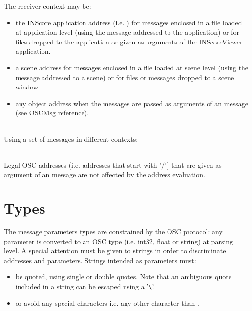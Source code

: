 \documentclass[a4paper,twoside]{report}
\newcommand{\sublevel}[1]	{\section{#1}}
\begin{document}
The receiver context may be:
\begin{itemize}
\item the INScore application address (i.e. ) for messages enclosed in a file loaded at application level (using the  message addressed to the application) or for files dropped to the application or given as arguments of the INScoreViewer application.
\item a scene address for messages enclosed in a file loaded at scene level (using the  message addressed to a scene) or for files or messages dropped to a scene window.
\item any object address when the messages are passed as arguments of an  message (see \href{https://inscoredoc.grame.fr/refs/4-miscmsgs/}{OSCMsg reference}).
\end{itemize}

\example\\
Using a set of messages in different contexts:

\note{}\\
Legal OSC addresses (i.e. addresses that start with '/') that are given as argument of an  message are not affected by the address evaluation.


\sublevel{Types}
\label{scripttypes}

The message parameters types are constrained by the OSC protocol: any parameter is converted to an OSC type (i.e. int32, float or string) at parsing level.
A special attention must be given to strings in order to discriminate addresses and parameters. Strings intended as parameters must:
\begin{itemize}
\item be quoted, using single or double quotes. Note that an ambiguous quote included in a string can be escaped using a '\verb+\+'.
\item or avoid any special characters i.e. any other character than \OSC{[\_-a-zA-Z0-9]}.
\end{itemize}
\end{document}
